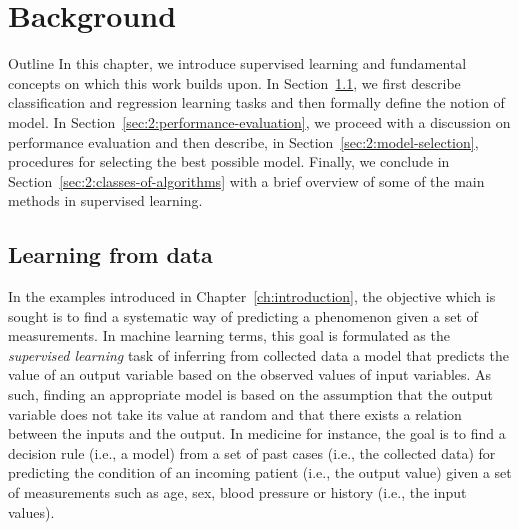 \chapter{Background}\label{ch:background}

\begin{remark}{Outline}
In this chapter, we introduce supervised learning and fundamental concepts on
which this work builds upon. In Section~\ref{sec:2:learning-from-data}, we
first describe classification and regression learning tasks and then formally
define the notion of model. In Section~\ref{sec:2:performance-evaluation}, we
proceed with a discussion on performance evaluation and then describe, in
Section~\ref{sec:2:model-selection}, procedures for selecting the best possible
model. Finally, we conclude in Section~\ref{sec:2:classes-of-algorithms} with a
brief overview of some of the main methods in supervised learning.
\end{remark}

\section{Learning from data}
\label{sec:2:learning-from-data}

In the examples introduced in Chapter~\ref{ch:introduction}, the objective
which is sought is to find a systematic way of predicting a phenomenon given a
set of measurements. In machine learning terms, this goal is formulated as the
{\it supervised learning} task of inferring from collected data a model that
predicts the value of an output variable based on the observed values of input
variables. As such, finding an appropriate model is based on the assumption
that the output variable does not take its value at random and that there
exists a relation between the inputs and the output. In medicine for instance,
the goal is to find a decision rule (i.e., a model) from a set of past cases
(i.e., the collected data) for predicting the condition of an incoming patient
(i.e., the output value) given a set of measurements such as age, sex, blood
pressure or history (i.e., the input values).

